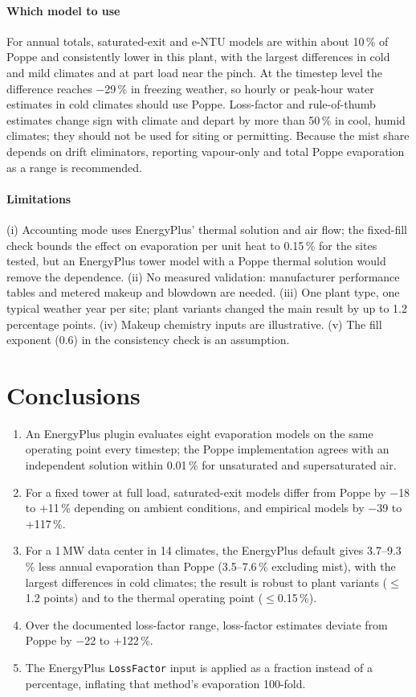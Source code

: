 \documentclass[preprint,12pt,authoryear]{elsarticle}
\begin{document}
\paragraph{Which model to use} For annual totals, saturated-exit and e-NTU models are within about 10\,\% of Poppe and
consistently lower in this plant, with the largest differences in cold and mild climates and at part load near the pinch.
At the timestep level the difference reaches $-$29\,\% in freezing weather, so hourly or peak-hour water estimates in cold
climates should use Poppe. Loss-factor and rule-of-thumb estimates change sign with climate and depart by more than 50\,\%
in cool, humid climates; they should not be used for siting or permitting. Because the mist share depends on drift
eliminators, reporting vapour-only and total Poppe evaporation as a range is recommended.

\paragraph{Limitations} (i) Accounting mode uses EnergyPlus' thermal solution and air flow; the fixed-fill check bounds
the effect on evaporation per unit heat to 0.15\,\% for the sites tested, but an EnergyPlus tower model with a Poppe thermal
solution would remove the dependence. (ii) No measured validation: manufacturer performance tables and metered makeup and
blowdown are needed. (iii) One plant type, one typical weather year per site; plant variants changed the main result by up
to 1.2 percentage points. (iv) Makeup chemistry inputs are illustrative. (v) The fill exponent (0.6) in the consistency check
is an assumption.

\section{Conclusions}
\begin{enumerate}
\item An EnergyPlus plugin evaluates eight evaporation models on the same operating point every timestep; the Poppe
implementation agrees with an independent solution within 0.01\,\% for unsaturated and supersaturated air.
\item For a fixed tower at full load, saturated-exit models differ from Poppe by $-$18 to +11\,\% depending on ambient
conditions, and empirical models by $-$39 to +117\,\%.
\item For a 1\,MW data center in 14 climates, the EnergyPlus default gives 3.7--9.3\,\% less annual evaporation than Poppe
(3.5--7.6\,\% excluding mist), with the largest differences in cold climates; the result is robust to plant variants
($\le$1.2 points) and to the thermal operating point ($\le$0.15\,\%).
\item Over the documented loss-factor range, loss-factor estimates deviate from Poppe by $-$22 to +122\,\%.
\item The EnergyPlus \texttt{LossFactor} input is applied as a fraction instead of a percentage, inflating that method's
evaporation 100-fold.
\end{enumerate}
\end{document}
